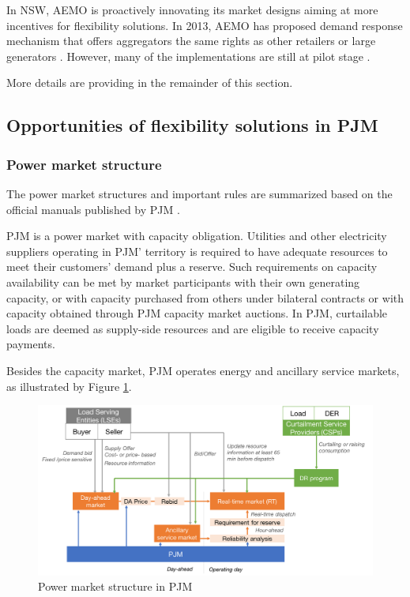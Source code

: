 In NSW, AEMO is proactively innovating its market designs aiming at more incentives for flexibility solutions. In 2013, AEMO has proposed demand response mechanism that offers aggregators the same rights as other retailers or large generators \cite{AEMO_DR_1}. However, many of the implementations are still at pilot stage \cite{AEMO_DR,AEMO_DR_Pilot}.

More details are providing in the remainder of this section.

\subsection{Opportunities of flexibility solutions in PJM}

\subsubsection{Power market structure}

The power market structures and important rules are summarized based on the official manuals published by PJM \cite{PJM2017b,PJM2017c,PJMInterconnection2017,PJM_web}.

PJM is a power market with capacity obligation. Utilities and other electricity suppliers operating in PJM' territory is required to have adequate resources to meet their customers' demand plus a reserve. Such requirements on capacity availability can be met by market participants with their own generating capacity, or with capacity purchased from others under bilateral contracts or with capacity obtained through PJM capacity market auctions. In PJM, curtailable loads are deemed as supply-side resources and are eligible to receive capacity payments.

Besides the capacity market, PJM operates energy and ancillary service markets, as illustrated by Figure \ref{fig:pjm-market-structure}.

\begin{figure}[h!]
	\centering
	\includegraphics[width=0.95\linewidth]{Figures/PJM_market-structure}
	\caption{Power market structure in PJM}
	\label{fig:pjm-market-structure}
\end{figure}

